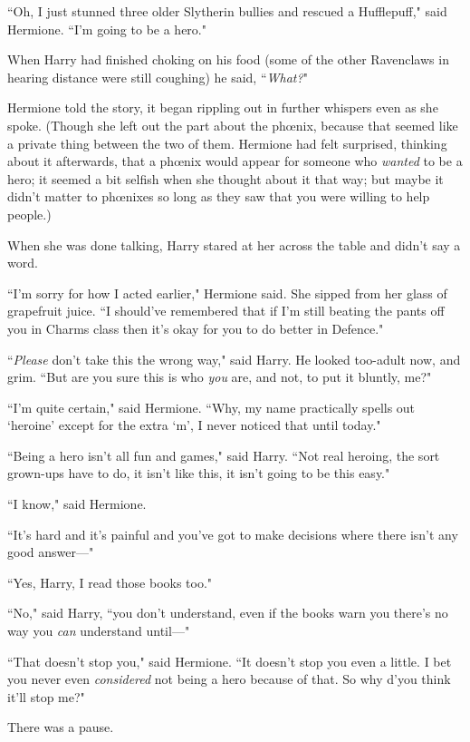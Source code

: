 ``Oh, I just stunned three older Slytherin bullies and rescued a Hufflepuff," said Hermione. ``I'm going to be a hero."

When Harry had finished choking on his food (some of the other Ravenclaws in hearing distance were still coughing) he said, ``\emph{What?}"

Hermione told the story, it began rippling out in further whispers even as she spoke. (Though she left out the part about the phœnix, because that seemed like a private thing between the two of them. Hermione had felt surprised, thinking about it afterwards, that a phœnix would appear for someone who \emph{wanted} to be a hero; it seemed a bit selfish when she thought about it that way; but maybe it didn't matter to phœnixes so long as they saw that you were willing to help people.)

When she was done talking, Harry stared at her across the table and didn't say a word.

``I'm sorry for how I acted earlier," Hermione said. She sipped from her glass of grapefruit juice. ``I should've remembered that if I'm still beating the pants off you in Charms class then it's okay for you to do better in Defence."

``\emph{Please} don't take this the wrong way," said Harry. He looked too-adult now, and grim. ``But are you sure this is who \emph{you} are, and not, to put it bluntly, me?"

``I'm quite certain," said Hermione. ``Why, my name practically spells out `heroine' except for the extra `m', I never noticed that until today."

``Being a hero isn't all fun and games," said Harry. ``Not real heroing, the sort grown-ups have to do, it isn't like this, it isn't going to be this easy."

``I know," said Hermione.

``It's hard and it's painful and you've got to make decisions where there isn't any good answer—"

``Yes, Harry, I read those books too."

``No," said Harry, ``you don't understand, even if the books warn you there's no way you \emph{can} understand until—"

``That doesn't stop you," said Hermione. ``It doesn't stop you even a little. I bet you never even \emph{considered} not being a hero because of that. So why d'you think it'll stop me?"

There was a pause.


